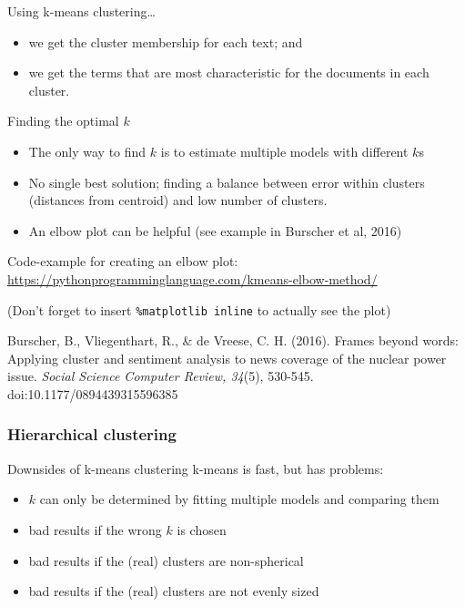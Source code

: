 \begin{frame}{Using k-means clustering\ldots}
\begin{itemize}
\item we get the cluster membership for each text; and
\item we get the terms that are most characteristic for the documents in each cluster.
\end{itemize}
\end{frame}

\begin{frame}{Finding the optimal $k$}

\begin{itemize}
\item The only way to find $k$ is to estimate multiple models with different $k$s
\item No single best solution; finding a balance between error within clusters (distances from centroid) and low number of clusters.
\item An elbow plot can be helpful (see example in Burscher et al, 2016)
\end{itemize}

\pause

\footnotesize 
Code-example for creating an elbow plot:
\url{https://pythonprogramminglanguage.com/kmeans-elbow-method/}

(Don't forget to insert \texttt{\%matplotlib inline} to actually see the plot)


\tiny{Burscher, B., Vliegenthart, R., \& de Vreese, C. H. (2016). Frames beyond words: Applying cluster and sentiment analysis to news coverage of the
nuclear power issue.\textit{ Social Science Computer Review, 34}(5), 530-545. doi:10.1177/0894439315596385}
\end{frame}


\subsubsection{Hierarchical clustering}

\begin{frame}{Downsides of k-means clustering}
k-means is fast, but has problems:

\begin{itemize}
\item $k$ can only be determined by fitting multiple models and comparing them
\item bad results if the wrong $k$ is chosen
\item bad results if the (real) clusters are non-spherical
\item bad results if the (real) clusters are not evenly sized
\end{itemize}
\end{frame}


